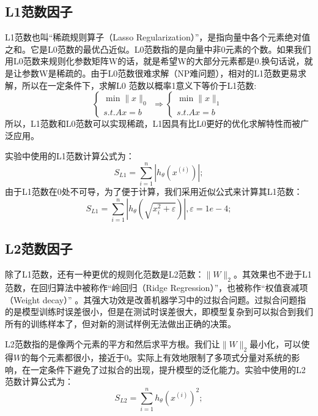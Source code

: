 \documentclass[oneside]{ZJUthesis}
\begin{document}
\subsection{L1范数因子}
L1范数也叫``稀疏规则算子（Lasso Regularization）''，是指向量中各个元素绝对值之和。它是L0范数的最优凸近似\cite{DBLP:conf/cvpr/YangYGH09}。L0范数指的是向量中非0元素的个数。如果我们用L0范数来规则化参数矩阵W的话，就是希望W的大部分元素都是0.换句话说，就是让参数W是稀疏的。由于L0范数很难求解（NP难问题），相对的L1范数更易求解，所以在一定条件下，求解L0 范数以概率1意义下等价于L1范数:
\begin{equation}
\left\{ \begin{array}{l}
\min \|x\|_0 \\
s.t.Ax = b
\end{array} \right. \Rightarrow \left\{ \begin{array}{l}
\min \|x\|_1 \\
s.t.Ax = b
\end{array} \right.
\end{equation}
所以，L1范数和L0范数可以实现稀疏，L1因具有比L0更好的优化求解特性而被广泛应用。

实验中使用的L1范数计算公式为：
\begin{equation}
S_{L1}=\sum\limits_{i=1}^{n}{|h_{\theta}(x^{(i)})|};
\end{equation}
由于L1范数在0处不可导\cite{DBLP:conf/nips/LeeBRN06}，为了便于计算，我们采用近似公式来计算其L1范数\cite{DBLP:journals/corr/abs-1005-4717}：
\begin{equation}
S_{L1}=\sum\limits_{i=1}^{n}{|h_{\theta}(\sqrt{x_i^2+\varepsilon})|},\varepsilon =1e-4;
\end{equation}

\subsection{L2范数因子}
除了L1范数，还有一种更优的规则化范数是L2范数：$\|W\|_2$。其效果也不逊于L1范数，在回归算法中被称作``岭回归（Ridge Regression）''，也被称作``权值衰减项（Weight decay）'' \cite{yang2011robust}。其强大功效是改善机器学习中的过拟合问题。过拟合问题指的是模型训练时误差很小，但是在测试时误差很大，即模型复杂到可以拟合到我们所有的训练样本了，但对新的测试样例无法做出正确的决策。

L2范数指的是像两个元素的平方和然后求平方根。我们让$\|W\|_2$最小化，可以使得$W$的每个元素都很小，接近于0。实际上有效地限制了多项式分量对系统的影响，在一定条件下避免了过拟合的出现，提升模型的泛化能力。实验中使用的L2范数计算公式为：
\begin{equation}
S_{L2}=\sum\limits_{i=1}^{n}{h_{\theta}(x^{(i)})^2};
\end{equation}
\end{document}
